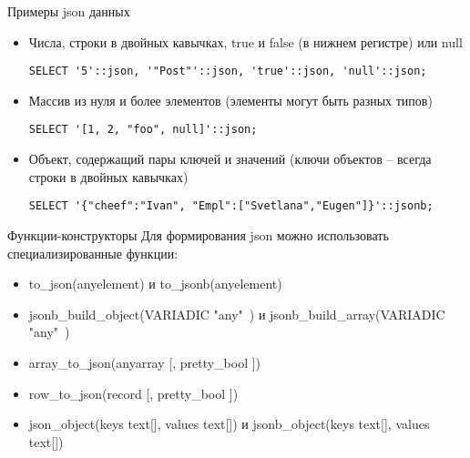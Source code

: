 \documentclass[12pt]{article}
\begin{document}
\begin{Example}{Примеры json данных}
    \begin{itemize}
        \item Числа, строки в двойных кавычках, true и false (в нижнем регистре) или null 
        
        \begin{lstlisting}
SELECT '5'::json, '"Post"'::json, 'true'::json, 'null'::json;
        \end{lstlisting}

        \item Массив из нуля и более элементов (элементы могут быть разных типов)
        
        \begin{lstlisting}
SELECT '[1, 2, "foo", null]'::json;
        \end{lstlisting}

        \item Объект, содержащий пары ключей и значений (ключи объектов -- всегда строки в двойных кавычках)
        
        \begin{lstlisting}
SELECT '{"cheef":"Ivan", "Empl":["Svetlana","Eugen"]}'::jsonb;
        \end{lstlisting}
    \end{itemize}
\end{Example}

\begin{defin}{Функции-конструкторы}
    Для формирования json можно использовать специализированные функции:

    \begin{itemize}
        \item to\_json(anyelement) и to\_jsonb(anyelement) 
        \item jsonb\_build\_object(VARIADIC "any"\ ) и jsonb\_build\_array(VARIADIC "any"\ )
        \item array\_to\_json(anyarray [, pretty\_bool ]) 
        \item row\_to\_json(record [, pretty\_bool ])
        \item json\_object(keys text[], values text[]) и jsonb\_object(keys text[], values text[])
    \end{itemize}
\end{defin}
\end{document}
